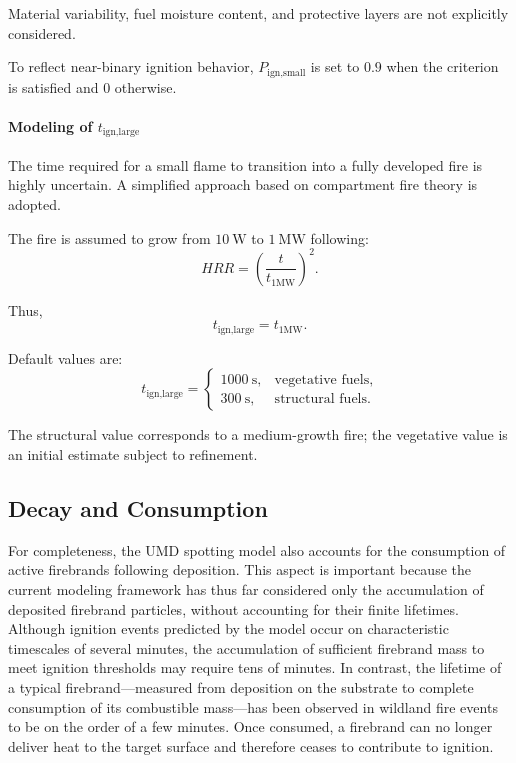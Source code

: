 Material variability, fuel moisture content, and protective layers are not explicitly considered.

To reflect near-binary ignition behavior, $P_{\text{ign,small}}$ is set to $0.9$ when the criterion is satisfied and $0$ otherwise.

\paragraph{Modeling of $t_{\text{ign,large}}$}

The time required for a small flame to transition into a fully developed fire is highly uncertain. A simplified approach based on compartment fire theory is adopted.

The fire is assumed to grow from $10~\mathrm{W}$ to $1~\mathrm{MW}$ following:
\[
HRR = \left(\frac{t}{t_{1\mathrm{MW}}}\right)^2.
\]

Thus,
\[
t_{\text{ign,large}} = t_{1\mathrm{MW}}.
\]

Default values are:
\[
t_{\text{ign,large}} =
\begin{cases}
1000~\mathrm{s}, & \text{vegetative fuels},\\
300~\mathrm{s}, & \text{structural fuels}.
\end{cases}
\]

The structural value corresponds to a medium-growth fire; the vegetative value is an initial estimate subject to refinement.

\subsection{Decay and Consumption}

For completeness, the UMD spotting model also accounts for the consumption of active firebrands following deposition. This aspect is important because the current modeling framework has thus far considered only the accumulation of deposited firebrand particles, without accounting for their finite lifetimes. Although ignition events predicted by the model occur on characteristic timescales of several minutes, the accumulation of sufficient firebrand mass to meet ignition thresholds may require tens of minutes. In contrast, the lifetime of a typical firebrand—measured from deposition on the substrate to complete consumption of its combustible mass—has been observed in wildland fire events to be on the order of a few minutes. Once consumed, a firebrand can no longer deliver heat to the target surface and therefore ceases to contribute to ignition.

